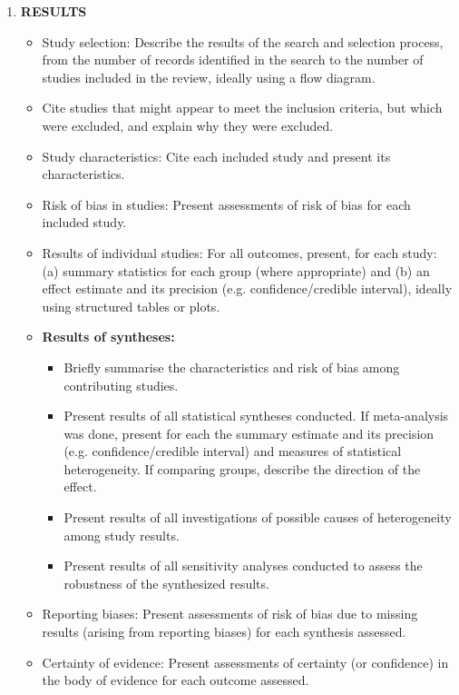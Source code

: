 \documentclass{article}
\begin{document}
\begin{enumerate}
    \item \textbf{RESULTS}
    \begin{itemize}
        \item[19a.] Study selection: Describe the results of the search and selection process, from the number of records identified in the search to the number of studies included in the review, ideally using a flow diagram.
        \item[19b.] Cite studies that might appear to meet the inclusion criteria, but which were excluded, and explain why they were excluded.
        \item[20.] Study characteristics: Cite each included study and present its characteristics.
        \item[21.] Risk of bias in studies: Present assessments of risk of bias for each included study.
        \item[22.] Results of individual studies: For all outcomes, present, for each study: (a) summary statistics for each group (where appropriate) and (b) an effect estimate and its precision (e.g. confidence/credible interval), ideally using structured tables or plots.
        \item[23] \textbf{Results of syntheses:}
        \begin{itemize}
            \item[23a.] Briefly summarise the characteristics and risk of bias among contributing studies.
            \item[23b.] Present results of all statistical syntheses conducted. If meta-analysis was done, present for each the summary estimate and its precision (e.g. confidence/credible interval) and measures of statistical heterogeneity. If comparing groups, describe the direction of the effect.
            \item[23c.] Present results of all investigations of possible causes of heterogeneity among study results.
            \item[23d.] Present results of all sensitivity analyses conducted to assess the robustness of the synthesized results.
        \end{itemize}
        \item[24.] Reporting biases: Present assessments of risk of bias due to missing results (arising from reporting biases) for each synthesis assessed.
        \item[25.] Certainty of evidence: Present assessments of certainty (or confidence) in the body of evidence for each outcome assessed.
    \end{itemize}
    

\end{enumerate}
\end{document}
